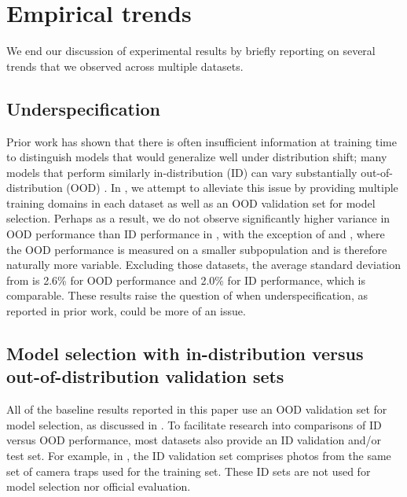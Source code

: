 \section{Empirical trends}\label{sec:discussion}
We end our discussion of experimental results by briefly reporting on several trends that we observed across multiple datasets.

\subsection{Underspecification}
Prior work has shown that there is often insufficient information at training time to distinguish models that would generalize well under distribution shift;
many models that perform similarly in-distribution (ID) can vary substantially out-of-distribution (OOD) \citep{mccoy2019berts,zhou2020curse,damour2020underspecification}.
In \Wilds, we attempt to alleviate this issue by providing multiple training domains in each dataset as well as an OOD validation set for model selection.
Perhaps as a result, we do not observe significantly higher variance in OOD performance than ID performance in , with the exception of
\Amazon and \CivilComments, where the OOD performance is measured on a smaller subpopulation and is therefore naturally more variable.
Excluding those datasets, the average standard deviation from  is 2.6\% for OOD performance and 2.0\% for ID performance, which is comparable.
These results raise the question of when underspecification, as reported in prior work, could be more of an issue.

\subsection{Model selection with in-distribution versus out-of-distribution validation sets}
All of the baseline results reported in this paper use an OOD validation set for model selection, as discussed in .
To facilitate research into comparisons of ID versus OOD performance, most \Wilds datasets also provide an ID validation and/or test set.
For example, in \iWildCam, the ID validation set comprises photos from the same set of camera traps used for the training set.
These ID sets are not used for model selection nor official evaluation.

